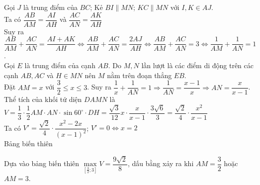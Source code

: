 \begin{ex}
{{
		}
		Gọi $J$ là trung điểm của $BC$; Kẻ $BI\parallel MN$; $KC\parallel MN$ với $I,K\in AJ$.\\
		Ta có $\dfrac{AB}{AM}=\dfrac{AI}{AH}$ và $\dfrac{AC}{AN}=\dfrac{AK}{AH}$\\
		Suy ra $\dfrac{AB}{AM}+\dfrac{AC}{AN}=\dfrac{AI+AK}{AH}\Leftrightarrow\dfrac{AB}{AM}+\dfrac{AC}{AN}=\dfrac{2AJ}{AH}\Leftrightarrow\dfrac{AB}{AM}+\dfrac{AC}{AN}=3\Leftrightarrow\dfrac{1}{AM}+\dfrac{1}{AN}=1$.\\
		Gọi $E$ là trung điểm của cạnh $AB$. Do $M,N$ lần lượt là các điểm di động trên các cạnh $AB,AC$ và $H\in MN$ nên $M$ nằm trên đoạn thẳng $EB$.\\
		Đặt $AM=x$ với $\dfrac{3}{2}\le x\le 3$. Suy ra $\dfrac{1}{x}+\dfrac{1}{AN}=1\Rightarrow\dfrac{1}{AN}=\dfrac{x-1}{x}\Rightarrow AN=\dfrac{x}{x-1}$.\\
		Thể tích của khối tứ diện $DAMN$ là\\
		$V=\dfrac{1}{3}\cdot\dfrac{1}{2}AM\cdot AN\cdot \sin 60^\circ \cdot DH=\dfrac{\sqrt{3}}{12}x\cdot\dfrac{x}{x-1}\cdot\dfrac{3\sqrt{6}}{3}=\dfrac{\sqrt{2}}{4}\cdot\dfrac{x^2}{x-1}$\\
		Ta có $V'=\dfrac{\sqrt{2}}{4}\cdot\dfrac{x^2-2x}{\left(x-1\right)^2}$; $V'=0\Leftrightarrow x=2$\\
		Bảng biến thiên
		\begin{center}
		\end{center}
		Dựa vào bảng biến thiên $\underset{\left[\tfrac{3}{2};3\right]}{\max}V=\dfrac{9\sqrt{2}}{8}$, dấu bằng xảy ra khi $AM=\dfrac{3}{2}$ hoặc $AM=3$.
	}
\end{ex}

